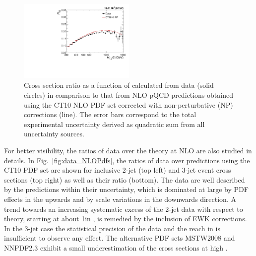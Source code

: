 \begin{figure}[!h]
 \begin{center}
 \includegraphics[width=0.50\textwidth]{Plots_HT_2_150/Sensitivity_ratio_32_CT10_only.pdf}%
 \caption{Cross section ratio \ratio as a function of \httwo calculated from data (solid circles) in comparison to that from NLO pQCD predictions obtained using the CT10 NLO PDF set corrected with non-perturbative (NP) corrections (line). The error bars correspond to the total experimental uncertainty derived as quadratic sum from all uncertainty sources.}
 \label{fig:ratiosens}
 \end{center}
\end{figure}

For better visibility, the ratios of data over the theory at NLO are also studied in details. In Fig.~\ref{fig:data_NLOPdfs}, the ratios of data over \NLOJETPP predictions using the CT10 PDF set are shown for inclusive 2-jet (top left) and 3-jet event cross sections (top right) as well as their ratio \ratio (bottom). The data are well described by the predictions within their uncertainty, which is dominated at large \httwo by PDF effects in the upwards and by scale variations in the downwards direction. A trend towards an increasing systematic excess of the 2-jet data with respect to theory, starting at about 1\TeV in \httwo, is remedied by the inclusion of EWK corrections. In the 3-jet case the statistical precision of the data and the reach in \httwo is insufficient to observe any effect. The alternative PDF sets MSTW2008 and NNPDF2.3 exhibit a small underestimation of the cross sections at high \httwo.

